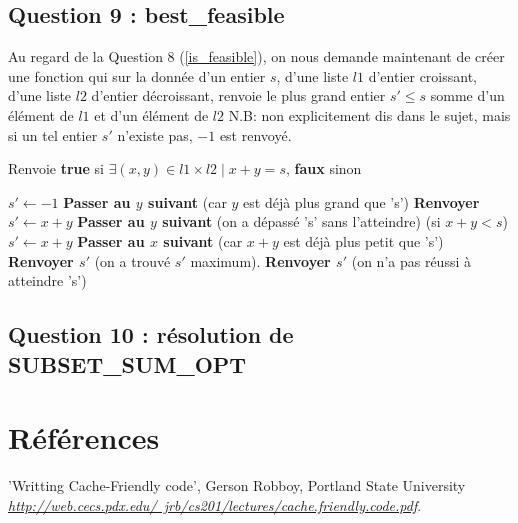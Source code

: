 \documentclass[10pt]{article}
\begin{document}
			\subsection{Question 9 : best\_feasible}
				Au regard de la Question 8 (\ref{is_feasible}), on nous demande maintenant de créer une fonction qui sur
				la donnée d'un entier $s$, d'une liste $l1$ d'entier croissant, d'une liste $l2$ d'entier décroissant,
				renvoie le plus grand entier $s' \leq s$ somme d'un élément de $l1$ et d'un élément de $l2$
				\newline
				\newline
				N.B: non explicitement dis dans le sujet, mais si un tel entier $s'$ n'existe pas, $-1$ est renvoyé.
				\begin{algorithm}
					\caption{Renvoie \textbf{true} si $\exists (x, y) \in l1 \times l2 \mid x + y = s$, \textbf{faux} sinon}
					\begin{algorithmic}[1]
							\State $s' \leftarrow -1$
									\State \textbf{Passer au $y$ suivant} (car $y$ est déjà plus grand que 's')
								\EndIf
										\State \textbf{Renvoyer $s' \leftarrow x + y$}
										\State \textbf{Passer au $y$ suivant} (on a dépassé 's' sans l'atteindre)
									\Else (si $x + y < s$)
											\State $s' \leftarrow x + y$
										\EndIf
										\State \textbf{Passer au $x$ suivant} (car $x + y$ est déjà plus petit que 's')
									\EndIf
								\EndFor
								\State \textbf{Renvoyer $s'$} (on a trouvé $s'$ maximum).
							\EndFor
							\State \textbf{Renvoyer $s'$} (on n'a pas réussi à atteindre 's')
						\EndFunction
					\end{algorithmic}
				\end{algorithm}
				
			\newpage
			\subsection{Question 10 : résolution de SUBSET\_SUM\_OPT}

	\newpage
	\section{Références}
		\begin{thebibliography}{}
				'Writting Cache-Friendly code', Gerson Robboy, Portland State University\newline
				\href{http://web.cecs.pdx.edu/~jrb/cs201/lectures/cache.friendly.code.pdf}
				      {\textit{http://web.cecs.pdx.edu/~jrb/cs201/lectures/cache.friendly.code.pdf}}.
  \end{thebibliography}
\end{document}

